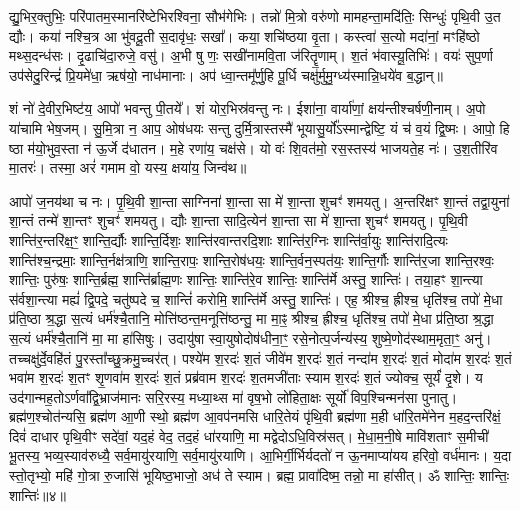 द्यु॒भिर॒क्तुभिः॒ परि॑पातम॒स्मानरि॑ष्टेभिरश्विना॒ सौभ॑गेभिः। तन्नो॑ मि॒त्रो वरु॑णो मामहन्ता॒मदि॑तिः॒ सिन्धुः॑ पृथि॒वी उ॒त द्यौः। कया॑ नश्चि॒त्र आ भु॑वदू॒ती स॒दावृ॑धः॒ सखा᳚। कया॒ शचि॑ष्ठया वृ॒ता। कस्त्वा॑ स॒त्यो मदा॑नां॒ मꣳहि॑ष्ठो मथ्स॒दन्ध॑सः। दृ॒ढाचि॑दा॒रुजे॒ वसु॑। अ॒भी षु णः॒ सखी॑नामवि॒ता ज॑रितॄ॒णाम्। श॒तं भ॑वास्यू॒तिभिः॑। वयः॑ सुप॒र्णा उप॑सेदु॒रिन्द्रं॑ प्रि॒यमे॑धा॒ ऋष॑यो॒ नाध॑मानाः। अप॑ ध्वा॒न्तमू᳚र्णु॒हि पू॒र्धि चक्षु॑र्मुमु॒ग्ध्य॑स्मान्नि॒धये॑व ब॒द्धान्॥

शं नो॑ दे॒वीर॒भिष्ट॑य॒ आपो॑ भवन्तु पी॒तये᳚। शं योर॒भिस्र॑वन्तु नः। ईशा॑ना॒ वार्या॑णां॒ क्षय॑न्तीश्चर्\mbox{}षणी॒नाम्। अ॒पो या॑चामि भेष॒जम्। सु॒मि॒त्रा न॒ आप॒ ओष॑धयः सन्तु दुर्मि॒त्रास्तस्मै॑ भूयासु॒र्यो᳚ऽस्मान्द्वेष्टि॒ यं च॑ व॒यं द्वि॒ष्मः। आपो॒ हि ष्ठा म॑यो॒भुव॒स्ता न॑ ऊ॒र्जे द॑धातन। म॒हे रणा॑य॒ चक्ष॑से। यो वः॑ शि॒वत॑मो॒ रस॒स्तस्य॑ भाजयते॒ह नः॑। उ॒श॒तीरि॑व मा॒तरः॑। तस्मा॒ अरं॑ गमाम वो॒ यस्य॒ क्षया॑य॒ जिन्व॑थ॥

आपो॑ ज॒नय॑था च नः। पृ॒थि॒वी शा॒न्ता साग्निना॑ शा॒न्ता सा मे॑ शा॒न्ता शुचꣳ॑ शमयतु। अ॒न्तरि॑क्षꣳ शा॒न्तं तद्वा॒युना॑ शा॒न्तं तन्मे॑ शा॒न्तꣳ शुचꣳ॑ शमयतु। द्यौः  शा॒न्ता सादि॒त्येन॑ शा॒न्ता सा मे॑ शा॒न्ता शुचꣳ॑ शमयतु। पृ॒थि॒वी शान्ति॑र॒न्तरि॑क्ष॒ꣳ॒ शान्ति॒र्द्यौः  शान्ति॒र्दिशः॒ शान्ति॑रवान्तरदि॒शाः  शान्ति॑र॒ग्निः  शान्ति॑र्वा॒युः  शान्ति॑रादि॒त्यः  शान्ति॑श्च॒न्द्रमाः॒ शान्ति॒र्नक्ष॑त्राणि॒ शान्ति॒रापः॒ शान्ति॒रोष॑धयः॒ शान्ति॒र्वन॒स्पत॑यः॒ शान्ति॒र्गौः  शान्ति॑र॒जा शान्ति॒रश्वः॒ शान्तिः॒ पुरु॑षः॒ शान्ति॒र्ब्रह्म॒ शान्ति॑र्ब्राह्म॒णः  शान्तिः॒ शान्ति॑रे॒व शान्तिः॒ शान्ति॑र्मे अस्तु॒ शान्तिः॑। तया॒हꣳ शा॒न्त्या स॑र्वशा॒न्त्या मह्यं॑ द्वि॒पदे॒ चतु॑ष्पदे च॒ शान्तिं॑ करोमि॒ शान्ति॑र्मे अस्तु॒ शान्तिः॑। एह॒ श्रीश्च॒ ह्रीश्च॒ धृति॑श्च॒ तपो॑ मे॒धा प्र॑ति॒ष्ठा श्र॒द्धा स॒त्यं धर्म॑श्चै॒तानि॒ मोत्ति॑ष्ठन्त॒मनूत्ति॑ष्ठन्तु॒ मा मा॒ꣴ॒ श्रीश्च॒ ह्रीश्च॒ धृति॑श्च॒ तपो॑ मे॒धा प्र॑ति॒ष्ठा श्र॒द्धा स॒त्यं धर्म॑श्चै॒तानि॑ मा॒ मा हा॑सिषुः। उदायु॑षा स्वा॒युषोदोष॑धीना॒ꣳ॒ रसे॒नोत्प॒र्जन्य॑स्य॒ शुष्मे॒णोद॑स्थाम॒मृता॒ꣳ॒ अनु॑। तच्चक्षु॑र्दे॒वहि॑तं पु॒रस्ता᳚च्छु॒क्रमु॒च्चर॑त्। पश्ये॑म श॒रदः॑ श॒तं जीवे॑म श॒रदः॑ श॒तं नन्दा॑म श॒रदः॑ श॒तं मोदा॑म श॒रदः॑ श॒तं भवा॑म श॒रदः॑ श॒तꣳ शृ॒णवा॑म श॒रदः॑ श॒तं प्रब्र॑वाम श॒रदः॑ श॒तमजी॑ताः स्याम श॒रदः॑ श॒तं ज्योक्च॒ सूर्यं॑ दृ॒शे। य उद॑गान्मह॒तोऽर्णवा᳚द्वि॒भ्राज॑मानः सरि॒रस्य॒ मध्या॒थ्स मा॑ वृष॒भो लो॑हिता॒क्षः सूर्यो॑ विप॒श्चिन्मन॑सा पुनातु। ब्रह्म॑ण॒श्चोत॑न्यसि॒ ब्रह्म॑ण आ॒णी स्थो॒ ब्रह्म॑ण आ॒वप॑नमसि धारि॒तेयं पृ॑थि॒वी ब्रह्म॑णा म॒ही धा॑रि॒तमे॑नेन म॒हद॒न्तरि॑क्षं॒ दिवं॑ दाधार पृथि॒वीꣳ सदे॑वां॒ यद॒हं वेद॒ तद॒हं धा॑रयाणि॒ मा मद्वेदोऽधि॒विस्र॑सत्। मे॒धा॒म॒नी॒षे मावि॑शताꣳ स॒मीची॑ भू॒तस्य॒ भव्य॒स्याव॑रुध्यै॒ सर्व॒मायु॑रयाणि॒ सर्व॒मायु॑रयाणि। आ॒भिर्गी॒र्भिर्यदतो॑ न ऊ॒नमाप्या॑यय हरिवो॒ वर्ध॑मानः। य॒दा स्तो॒तृभ्यो॒ महि॑ गो॒त्रा रु॒जासि॑ भूयिष्ठ॒भाजो॒ अध॑ ते स्याम। ब्रह्म॒ प्रावा॑दिष्म॒ तन्नो॒ मा हा॑सीत्। ॐ शान्तिः॒ शान्तिः॒ शान्तिः॑॥४॥

